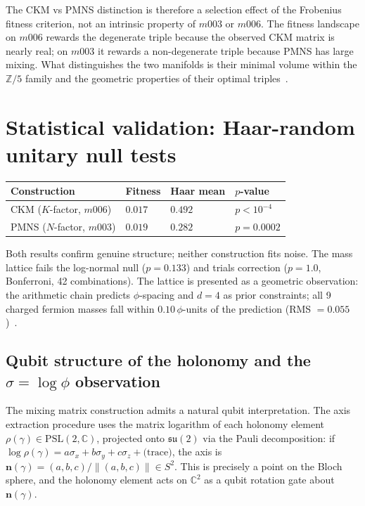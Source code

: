 ﻿\documentclass[12pt]{article}
\theoremstyle{definition}
\begin{document}
The CKM vs PMNS distinction is therefore a selection effect of the Frobenius fitness criterion, not an intrinsic property of $m003$ or $m006$. The fitness landscape on $m006$ rewards the degenerate triple because the observed CKM matrix is nearly real; on $m003$ it rewards a non-degenerate triple because PMNS has large mixing. What distinguishes the two manifolds is their minimal volume within the $\mathbb{Z}/5$ family and the geometric properties of their optimal triples~\cite{Gentry:Scan}.
\section{Statistical validation: Haar-random unitary null tests}
\label{sec:haar}

\begin{center}\small
\begin{tabular}{llll}
\toprule
Construction & Fitness & Haar mean & $p$-value\\
\midrule
CKM ($K$-factor, $m006$) & $0.017$ & $0.492$ & $p<10^{-4}$\\
PMNS ($N$-factor, $m003$) & $0.019$ & $0.282$ & $p=0.0002$\\
\bottomrule
\end{tabular}
\end{center}

Both results confirm genuine structure; neither construction fits noise.
The mass lattice fails the log-normal null ($p=0.133$) and trials
correction ($p=1.0$, Bonferroni, 42 combinations). The lattice is
presented as a geometric observation: the arithmetic chain predicts
$\phi$-spacing and $d=4$ as prior constraints; all 9 charged fermion
masses fall within $0.10\,\phi$-units of the prediction
(RMS $=0.055$)~\cite{Gentry:Scan}.


\subsection{Qubit structure of the holonomy and the $\sigma = \log\phi$ observation}
\label{subsec:qubit}

The mixing matrix construction admits a natural qubit interpretation.
The axis extraction procedure uses the matrix logarithm of each holonomy
element $\rho(\gamma)\in\mathrm{PSL}(2,\mathbb{C})$, projected onto
$\mathfrak{su}(2)$ via the Pauli decomposition: if
$\log\rho(\gamma) = a\sigma_x + b\sigma_y + c\sigma_z + \text{(trace)}$,
the axis is $\mathbf{n}(\gamma)=(a,b,c)/\|(a,b,c)\|\in S^2$.
This is precisely a point on the Bloch sphere, and the holonomy element
acts on $\mathbb{C}^2$ as a qubit rotation gate about $\mathbf{n}(\gamma)$.
\end{document}
